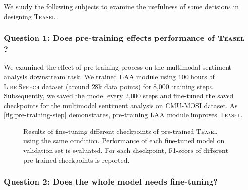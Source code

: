 \documentclass[letterpaper]{article} \usepackage{spconf,amsmath,graphicx}
\newcommand{\teasel}{\textsc{Teasel }}
\newcommand{\teaselns}{\textsc{Teasel}}
\begin{document}
We study the following subjects to examine the usefulness of some decisions in designing \teasel.

\subsubsection{Question 1: Does pre-training effects performance of \teasel?}

We examined the effect of pre-training process on the multimodal sentiment analysis downstream task. We trained LAA module using 100 hours of \textsc{LibriSpeech} dataset (around 28k data points) for 8,000 training steps. Subsequently, we saved the model every 2,000 steps and fine-tuned the saved checkpoints for the multimodal sentiment analysis on CMU-MOSI dataset. As \autoref{fig:pre-training-step} demonstrates, pre-training LAA module improves \teaselns.



\begin{figure}[hpt]
\centering
{}
\caption{\label{fig:pre-training-step} Results of fine-tuning different checkpoints of pre-trained \teasel using the same condition. Performance of each fine-tuned model on validation set is evaluated. For each checkpoint, F1-score of different pre-trained checkpoints is reported.}
\end{figure}



\subsubsection{Question 2: Does the whole model needs fine-tuning?}
\end{document}
